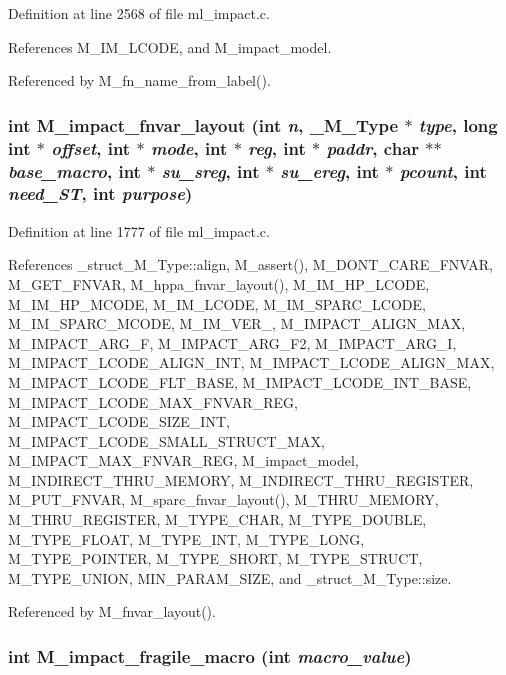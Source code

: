 Definition at line 2568 of file ml\_\-impact.c.

References M\_\-IM\_\-LCODE, and M\_\-impact\_\-model.

Referenced by M\_\-fn\_\-name\_\-from\_\-label().
\subsubsection{\setlength{\rightskip}{0pt plus 5cm}int M\_\-impact\_\-fnvar\_\-layout (int {\em n}, \bf{\_\-M\_\-Type} $\ast$ {\em type}, long int $\ast$ {\em offset}, int $\ast$ {\em mode}, int $\ast$ {\em reg}, int $\ast$ {\em paddr}, char $\ast$$\ast$ {\em base\_\-macro}, int $\ast$ {\em su\_\-sreg}, int $\ast$ {\em su\_\-ereg}, int $\ast$ {\em pcount}, int {\em need\_\-ST}, int {\em purpose})}\label{m__impact_8h_207bcdded4eed80210d0b158c71deef0}




Definition at line 1777 of file ml\_\-impact.c.

References \_\-struct\_\-M\_\-Type::align, M\_\-assert(), M\_\-DONT\_\-CARE\_\-FNVAR, M\_\-GET\_\-FNVAR, M\_\-hppa\_\-fnvar\_\-layout(), M\_\-IM\_\-HP\_\-LCODE, M\_\-IM\_\-HP\_\-MCODE, M\_\-IM\_\-LCODE, M\_\-IM\_\-SPARC\_\-LCODE, M\_\-IM\_\-SPARC\_\-MCODE, M\_\-IM\_\-VER\_, M\_\-IMPACT\_\-ALIGN\_\-MAX, M\_\-IMPACT\_\-ARG\_\-F, M\_\-IMPACT\_\-ARG\_\-F2, M\_\-IMPACT\_\-ARG\_\-I, M\_\-IMPACT\_\-LCODE\_\-ALIGN\_\-INT, M\_\-IMPACT\_\-LCODE\_\-ALIGN\_\-MAX, M\_\-IMPACT\_\-LCODE\_\-FLT\_\-BASE, M\_\-IMPACT\_\-LCODE\_\-INT\_\-BASE, M\_\-IMPACT\_\-LCODE\_\-MAX\_\-FNVAR\_\-REG, M\_\-IMPACT\_\-LCODE\_\-SIZE\_\-INT, M\_\-IMPACT\_\-LCODE\_\-SMALL\_\-STRUCT\_\-MAX, M\_\-IMPACT\_\-MAX\_\-FNVAR\_\-REG, M\_\-impact\_\-model, M\_\-INDIRECT\_\-THRU\_\-MEMORY, M\_\-INDIRECT\_\-THRU\_\-REGISTER, M\_\-PUT\_\-FNVAR, M\_\-sparc\_\-fnvar\_\-layout(), M\_\-THRU\_\-MEMORY, M\_\-THRU\_\-REGISTER, M\_\-TYPE\_\-CHAR, M\_\-TYPE\_\-DOUBLE, M\_\-TYPE\_\-FLOAT, M\_\-TYPE\_\-INT, M\_\-TYPE\_\-LONG, M\_\-TYPE\_\-POINTER, M\_\-TYPE\_\-SHORT, M\_\-TYPE\_\-STRUCT, M\_\-TYPE\_\-UNION, MIN\_\-PARAM\_\-SIZE, and \_\-struct\_\-M\_\-Type::size.

Referenced by M\_\-fnvar\_\-layout().
\subsubsection{\setlength{\rightskip}{0pt plus 5cm}int M\_\-impact\_\-fragile\_\-macro (int {\em macro\_\-value})}\label{m__impact_8h_f6abd5dc86b31ff6473ad12f25b0f357}





